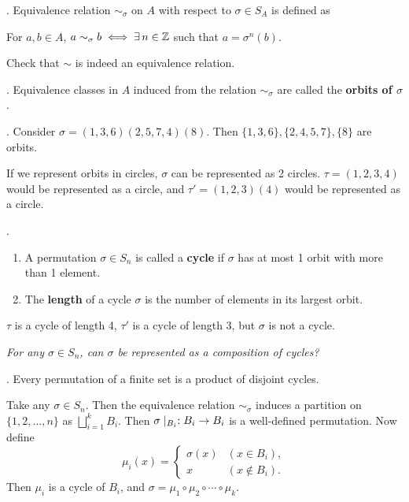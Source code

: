 
. Equivalence relation \(\sim_\sigma\) on \(A\) with respect to \(\sigma \in S_A\) is defined as
\begin{center}
    For \(a, b \in A\), \(a \sim_\sigma b \iff \exists n \in \Z\) such that \(a = \sigma^n(b)\).
\end{center}

\rmk Check that \(\sim\) is indeed an equivalence relation.

.  Equivalence classes in \(A\) induced from the relation \(\sim_\sigma\) are called the \textbf{orbits of \(\sigma\)}.

\ex. Consider \(\sigma = (1, 3, 6) (2, 5, 7, 4) (8)\). Then \(\{1, 3, 6\}, \{2, 4, 5, 7\}, \{8\}\) are orbits.

If we represent orbits in circles, \(\sigma\) can be represented as 2 circles. \(\tau = (1, 2, 3, 4)\) would be represented as a circle, and \(\tau' = (1, 2, 3)(4)\) would be represented as a circle.

. 
\begin{enumerate}
    \item A permutation \(\sigma \in S_n\) is called a \textbf{cycle} if \(\sigma\) has at most 1 orbit with more than 1 element.
    \item The \textbf{length} of a cycle \(\sigma\) is the number of elements in its largest orbit.
\end{enumerate}

\(\tau\) is a cycle of length 4, \(\tau'\) is a cycle of length 3, but \(\sigma\) is not a cycle.

\question \textit{For any \(\sigma \in S_n\), can \(\sigma\) be represented as a composition of cycles?}

\thm. Every permutation of a finite set is a product of disjoint cycles.

\pf Take any \(\sigma \in S_n\). Then the equivalence relation \(\sim_\sigma\) induces a partition on \(\{1, 2, \dots, n\}\) as \(\bigsqcup_{i = 1}^k B_i\). Then \(\sigma \mid_{B_i} : B_i \rightarrow B_i\) is a well-defined permutation. Now define
\[
    \mu_i(x) = \begin{cases}
        \sigma(x) & (x \in B_i), \\ x & (x \notin B_i).
    \end{cases}
\]
Then \(\mu_i\) is a cycle of \(B_i\), and \(\sigma = \mu_1 \circ \mu_2 \circ \cdots \circ \mu_k\).

